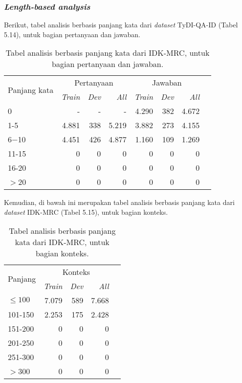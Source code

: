\subsubsection{\emph{Length-based analysis}}

Berikut, tabel analisis berbasis panjang kata dari \emph{dataset} TyDI-QA-ID (Tabel 5.14), untuk bagian pertanyaan dan jawaban.

\begin{table}[H]\centering
\begin{tabular}{lrrrrrrr}\toprule
\multirow{2}{*}{Panjang kata} &\multicolumn{3}{c}{Pertanyaan} &\multicolumn{3}{c}{Jawaban} \\\cmidrule{2-7}
&\emph{Train} &\emph{Dev} &\emph{All} &\emph{Train} &\emph{Dev} &\emph{All} \\\midrule
0 &- &- &- &4.290 &382 &4.672 \\
1-5 &4.881 &338 &5.219 &3.882 &273 &4.155 \\
6$-$10 &4.451 &426 &4.877 &1.160 &109 &1.269 \\
11-15 &0 &0 &0 &0 &0 &0 \\
16-20 &0 &0 &0 &0 &0 &0 \\
$>$20 &0 &0 &0 &0 &0 &0 \\
\bottomrule
\end{tabular}
\caption{Tabel analisis berbasis panjang kata dari IDK-MRC, untuk bagian pertanyaan dan jawaban.}
\end{table}

Kemudian, di bawah ini merupakan tabel analisis berbasis panjang kata dari \emph{dataset} IDK-MRC (Tabel 5.15), untuk bagian konteks.

\begin{table}[H]\centering
\begin{tabular}{lrrrr}\toprule
\multirow{2}{*}{Panjang} &\multicolumn{3}{c}{Konteks} \\\cmidrule{2-4}
&\emph{Train} &\emph{Dev} &\emph{All} \\\midrule
$\leq100$ &7.079 &589 &7.668 \\
101-150 &2.253 &175 &2.428 \\
151-200 &0 &0 &0 \\
201-250 &0 &0 &0 \\
251-300 &0 &0 &0 \\
$>$300 &0 &0 &0 \\
\bottomrule
\end{tabular}
\caption{Tabel analisis berbasis panjang kata dari IDK-MRC, untuk bagian konteks.}
\end{table}

